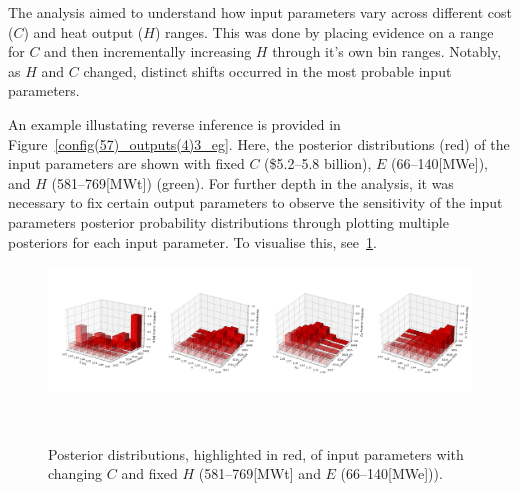 \documentclass[journal]{IEEEtran}
\begin{document}
The analysis aimed to understand how input parameters vary across different cost ($C$) and heat output ($H$) ranges. This was done by placing evidence on a range for $C$ and then incrementally increasing $H$ through it's own bin ranges. Notably, as $H$ and $C$ changed, distinct shifts occurred in the most probable input parameters. 

An example illustating reverse inference is provided in Figure~\ref{config(57)_outputs(4)3_eg}. Here, the posterior distributions (red) of the input parameters are shown with fixed $C$ (\$5.2--5.8 billion), $E$ (66--140[MWe]), and $H$ (581--769[MWt]) (green). For further depth in the analysis, it was necessary to fix certain output parameters to observe the sensitivity of the input parameters posterior probability distributions through plotting multiple posteriors for each input parameter. To visualise this, see~\ref{fig:posterior_planes3}.

\begin{figure}[t]
    \centering
    \includegraphics[width=\textwidth]{figures/TE_results/march_data/3D_posteriors.png}
    \caption{\small Posterior distributions, highlighted in red, of input parameters with changing $C$ and fixed $H$ (581--769[MWt] and $E$ (66--140[MWe])).}~\label{fig:posterior_planes3}
\end{figure}


\end{document}
